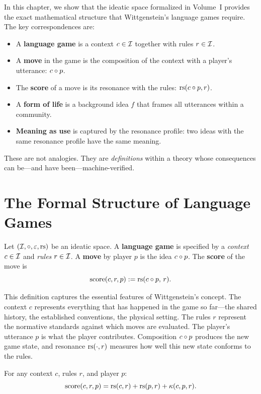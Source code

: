 In this chapter, we show that the ideatic space formalized in Volume~I provides
the exact mathematical structure that Wittgenstein's language games require.
The key correspondences are:
\begin{itemize}
\item A \textbf{language game} is a context $c \in \mathcal{I}$ together with rules $r \in \mathcal{I}$.
\item A \textbf{move} in the game is the composition of the context with a player's utterance: $c \circ p$.
\item The \textbf{score} of a move is its resonance with the rules: $\mathrm{rs}(c \circ p, r)$.
\item A \textbf{form of life} is a background idea $f$ that frames all utterances within a community.
\item \textbf{Meaning as use} is captured by the resonance profile: two ideas with the same resonance profile have the same meaning.
\end{itemize}

These are not analogies. They are \emph{definitions} within a theory whose
consequences can be---and have been---machine-verified.

\section{The Formal Structure of Language Games}

\begin{definition}
\label{def:language-game}
Let $(\mathcal{I}, \circ, \varepsilon, \mathrm{rs})$ be an ideatic space. A \textbf{language game}
is specified by a \emph{context} $c \in \mathcal{I}$ and \emph{rules} $r \in \mathcal{I}$.
A \textbf{move} by player $p$ is the idea $c \circ p$. The \textbf{score}
of the move is
\[
\mathrm{score}(c, r, p) := \mathrm{rs}(c \circ p,\, r).
\]
\end{definition}

This definition captures the essential features of Wittgenstein's concept.
The context $c$ represents everything that has happened in the game so far---the
shared history, the established conventions, the physical setting. The rules $r$
represent the normative standards against which moves are evaluated. The
player's utterance $p$ is what the player contributes. Composition $c \circ p$
produces the new game state, and resonance $\mathrm{rs}(\cdot, r)$ measures how well
this new state conforms to the rules.

\begin{theorem}
\label{thm:score-decompose}
For any context $c$, rules $r$, and player $p$:
\[
\mathrm{score}(c, r, p) = \mathrm{rs}(c, r) + \mathrm{rs}(p, r) + \kappa(c, p, r).
\]
\end{theorem}

